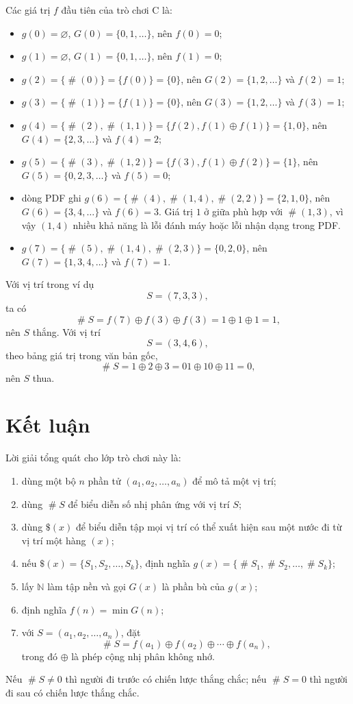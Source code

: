 \documentclass[11pt]{article}
\newcommand{\nimadd}{\oplus}
\newcommand{\val}[1]{\mathop{\#}\!#1}
\newcommand{\moves}[1]{\text{\$}(#1)}
\newcommand{\Nat}{\mathbb{N}}
\begin{document}
Các giá trị \(f\) đầu tiên của trò chơi C là:
\begin{itemize}
  \item \(g(0)=\varnothing\), \(G(0)=\{0,1,\ldots\}\), nên \(f(0)=0\);
  \item \(g(1)=\varnothing\), \(G(1)=\{0,1,\ldots\}\), nên \(f(1)=0\);
  \item \(g(2)=\{\val{(0)}\}=\{f(0)\}=\{0\}\), nên \(G(2)=\{1,2,\ldots\}\)
  và \(f(2)=1\);
  \item \(g(3)=\{\val{(1)}\}=\{f(1)\}=\{0\}\), nên \(G(3)=\{1,2,\ldots\}\)
  và \(f(3)=1\);
  \item \(g(4)=\{\val{(2)},\val{(1,1)}\}=\{f(2),f(1)\nimadd f(1)\}=\{1,0\}\),
  nên \(G(4)=\{2,3,\ldots\}\) và \(f(4)=2\);
  \item \(g(5)=\{\val{(3)},\val{(1,2)}\}=\{f(3),f(1)\nimadd f(2)\}=\{1\}\),
  nên \(G(5)=\{0,2,3,\ldots\}\) và \(f(5)=0\);
  \item dòng PDF ghi
  \(g(6)=\{\val{(4)},\val{(1,4)},\val{(2,2)}\}=\{2,1,0\}\), nên
  \(G(6)=\{3,4,\ldots\}\) và \(f(6)=3\). Giá trị \(1\) ở giữa phù hợp với
  \(\val{(1,3)}\), vì vậy \((1,4)\) nhiều khả năng là lỗi đánh máy hoặc lỗi
  nhận dạng trong PDF.
  \item \(g(7)=\{\val{(5)},\val{(1,4)},\val{(2,3)}\}=\{0,2,0\}\), nên
  \(G(7)=\{1,3,4,\ldots\}\) và \(f(7)=1\).
\end{itemize}

Với vị trí trong ví dụ
\[
  S=(7,3,3),
\]
ta có
\[
  \val{S}=f(7)\nimadd f(3)\nimadd f(3)=1\nimadd1\nimadd1=1,
\]
nên \(S\) thắng. Với vị trí
\[
  S=(3,4,6),
\]
theo bảng giá trị trong văn bản gốc,
\[
  \val{S}=1\nimadd2\nimadd3=01\nimadd10\nimadd11=0,
\]
nên \(S\) thua.

\section{Kết luận}

Lời giải tổng quát cho lớp trò chơi này là:
\begin{enumerate}
  \item dùng một bộ \(n\) phần tử \((a_1,a_2,\ldots,a_n)\) để mô tả một vị
  trí;
  \item dùng \(\val{S}\) để biểu diễn số nhị phân ứng với vị trí \(S\);
  \item dùng \(\moves{x}\) để biểu diễn tập mọi vị trí có thể xuất hiện sau
  một nước đi từ vị trí một hàng \((x)\);
  \item nếu \(\moves{x}=\{S_1,S_2,\ldots,S_k\}\), định nghĩa
  \(g(x)=\{\val{S_1},\val{S_2},\ldots,\val{S_k}\}\);
  \item lấy \(\Nat\) làm tập nền và gọi \(G(x)\) là phần bù của \(g(x)\);
  \item định nghĩa \(f(n)=\min G(n)\);
  \item với \(S=(a_1,a_2,\ldots,a_n)\), đặt
  \[
    \val{S}=f(a_1)\nimadd f(a_2)\nimadd\cdots\nimadd f(a_n),
  \]
  trong đó \(\nimadd\) là phép cộng nhị phân không nhớ.
\end{enumerate}
Nếu \(\val{S}\ne0\) thì người đi trước có chiến lược thắng chắc; nếu
\(\val{S}=0\) thì người đi sau có chiến lược thắng chắc.
\end{document}
